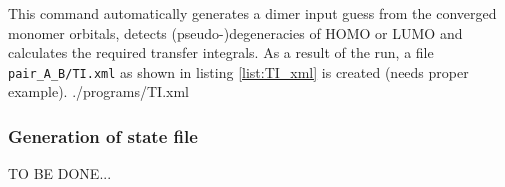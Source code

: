This command automatically generates a dimer input guess from the converged monomer orbitals, detects (pseudo-)degeneracies of HOMO or LUMO and calculates the required transfer integrals. As a result of the run, a file {\tt pair\_A\_B/TI.xml} as shown in listing \ref{list:TI_xml} is created (needs proper example).
 {./programs/TI.xml}
\subsubsection{Generation of state file}
TO BE DONE...

